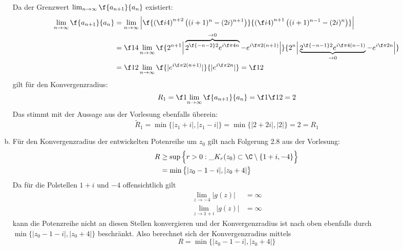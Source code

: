 \documentclass{mywork}
\begin{document}
\begin{aufgabe}
\begin{enumerate}[(a)]
			Da der Grenzwert $\lim_{n\to \infty} \f {a_{n+1}}{a_n}$ existiert:
			\begin{align*}
				\lim_{n\to \infty} \f {a_{n+1}}{a_n} 
				&= \lim_{n\to \infty} \left| \f {\left(\f i4\right)^{n+2}\big((i+1)^n - (2i)^{n+1}\big)} {\left(\f i4\right)^{n+1}\big((i+1)^{n-1} - (2i)^n\big)} \right|\\
				&= \f 14 \lim_{n\to\infty} \f {2^{n+1} \Big| \overbrace{2^{\f {-n-2}2} e^{i\f \pi 4 n}}^{\to 0} - e^{i \f \pi 2 (n+1)} \Big|}{2^n \Big| \underbrace{2^{\f {-n-1}2} e^{i \f \pi 4 (n-1)}}_{\to 0} -e^{i\f \pi 2 n} \Big |}\\
				&= \f 12 \lim_{n\to\infty} \f {|e^{i\f \pi 2 (n+1)}|}{|e^{i \f \pi 2 n}|}
				= \f 12
			\end{align*}
			gilt für den Konvergenzradius:
			\begin{align*}
				R_1 = \f 1{\displaystyle \lim_{n\to\infty} \f {a_{n+1}}{a_n}} = \f 1{\f 12} = 2
			\end{align*}
			Das stimmt mit der Aussage aus der Vorlesung ebenfalls überein:
			\[
				\tilde R_1 = \min \{ |z_1+i| ,|z_1-i|\} = \min\{ |2+2i|, |2|\} = 2 = R_1
			\]
		\item
			Für den Konvergenzradius der entwickelten Potenreihe um $z_0$ gilt nach Folgerung 2.8 aus der Vorlesung:
			\begin{align*}
				R 
				&\ge \sup \Big\{r>0 : \_{K_r(z_0)}\subset \C\setminus \{1+i,-4\}\Big\} \\
				&= \min \big\{|z_0-1-i|, |z_0+4|\big\}
			\end{align*}
			Da für die Polstellen $1+i$ und $-4$ offensichtlich gilt
			\begin{align*}
				\lim_{z\to -4} |g(z)| &= \infty \\
				\lim_{z\to 1+i} |g(z)| &= \infty
			\end{align*}
			kann die Potenzreihe nicht an diesen Stellen konvergieren und der Konvergenzradius ist nach oben ebenfalls durch $\min \{|z_0-1-i|, |z_0+4|\}$ beschränkt.
			Also berechnet sich der Konvergenzradius mittels
			\[
				R = \min \big\{|z_0-1-i|, |z_0+4|\big\}
			\]
	\end{enumerate}
\end{aufgabe}
\end{document}
